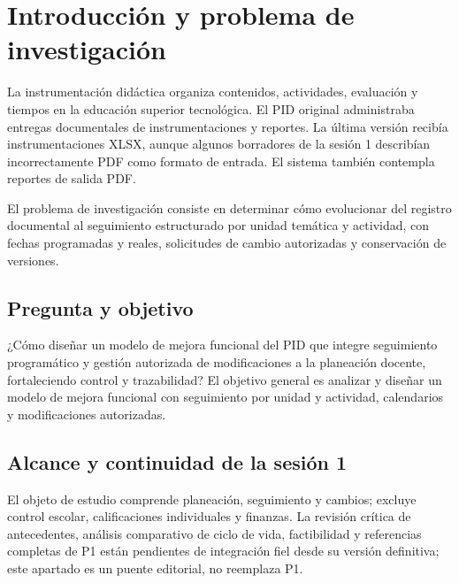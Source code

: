 \section{Introducción y problema de investigación}
La instrumentación didáctica organiza contenidos, actividades, evaluación y tiempos en la educación superior tecnológica. El PID original administraba entregas documentales de instrumentaciones y reportes. La última versión recibía instrumentaciones XLSX, aunque algunos borradores de la sesión 1 describían incorrectamente PDF como formato de entrada. El sistema también contempla reportes de salida PDF.

El problema de investigación consiste en determinar cómo evolucionar del registro documental al seguimiento estructurado por unidad temática y actividad, con fechas programadas y reales, solicitudes de cambio autorizadas y conservación de versiones.

\subsection{Pregunta y objetivo}
¿Cómo diseñar un modelo de mejora funcional del PID que integre seguimiento programático y gestión autorizada de modificaciones a la planeación docente, fortaleciendo control y trazabilidad? El objetivo general es analizar y diseñar un modelo de mejora funcional con seguimiento por unidad y actividad, calendarios y modificaciones autorizadas.

\subsection{Alcance y continuidad de la sesión 1}
El objeto de estudio comprende planeación, seguimiento y cambios; excluye control escolar, calificaciones individuales y finanzas. La revisión crítica de antecedentes, análisis comparativo de ciclo de vida, factibilidad y referencias completas de P1 están pendientes de integración fiel desde su versión definitiva; este apartado es un puente editorial, no reemplaza P1.
